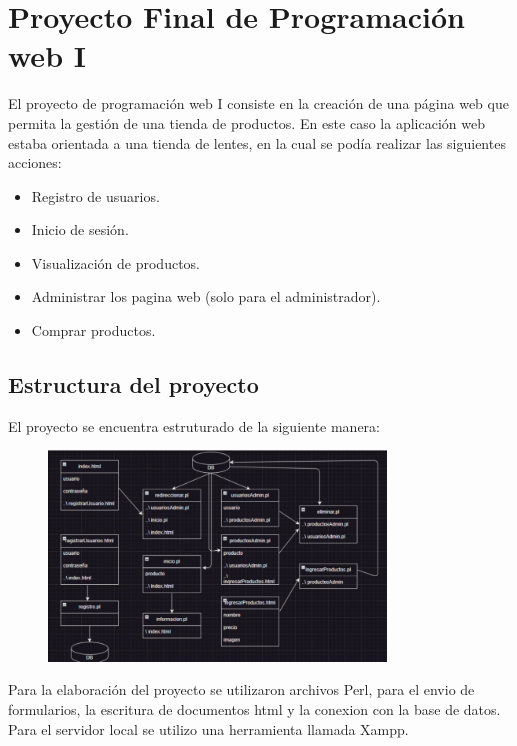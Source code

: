 \section{Proyecto Final de Programación web I}

El proyecto de programación web I consiste en la creación de una página web que permita la gestión de una tienda de productos. En este caso la aplicación web estaba orientada a una tienda de lentes, en la cual se podía realizar las siguientes acciones:
\begin{itemize}
    \item Registro de usuarios.
    \item Inicio de sesión.
    \item Visualización de productos.
    \item Administrar los pagina web (solo para el administrador).
    \item Comprar productos.
\end{itemize}

\subsection{Estructura del proyecto}

El proyecto se encuentra estruturado de la siguiente manera:
\clearpage

\begin{figure}[h]
    \centering
    \includegraphics[width=0.8\textwidth,keepaspectratio]{img/estructura.png}
\end{figure}

Para la elaboración del proyecto se utilizaron archivos Perl, para el envio de formularios, la escritura de documentos html y la conexion con la base de datos. Para el servidor local se utilizo una herramienta llamada Xampp.


